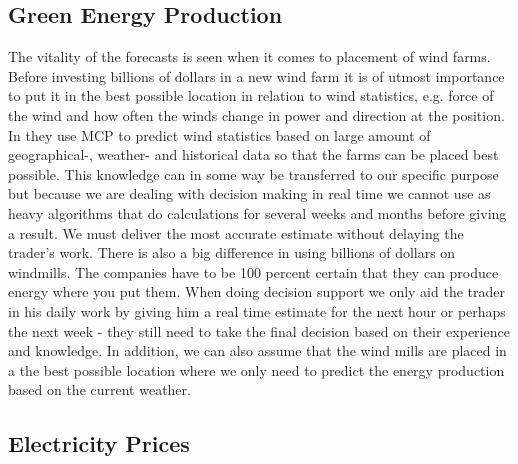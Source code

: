 \documentclass[twoside,11pt,openright]{report}
\begin{document}
\subsection{Green Energy Production}

The vitality of the forecasts is seen when it comes to
placement of wind farms. Before investing billions of dollars in a new wind farm it is of utmost importance to put it in the best possible location in relation to wind statistics, e.g. force of the wind and how often the winds change in power and direction at the position. In \cite{4} they use MCP to predict wind statistics based on large amount of geographical-, weather- and historical data so that the farms can be placed best possible. This knowledge can in some way be transferred to our specific purpose but because we are dealing with decision making in real time we cannot use as heavy algorithms that do calculations for several weeks and months before giving a result. We must deliver the most accurate estimate without delaying the trader's work.
There is also a big difference in using billions of dollars on windmills. The companies have to be 100 percent certain that they can produce energy where you put them. When doing decision support we only aid the trader in his daily work by giving him a real time estimate for the next hour or perhaps the next week - they still need to take the final decision based on their experience and knowledge. In addition, we can also assume that the wind mills are placed in a the best possible location where we only need to predict the energy production based on the current weather.

\subsection{Electricity Prices}
 
% 
%
\\[0.5cm]


\end{document}
